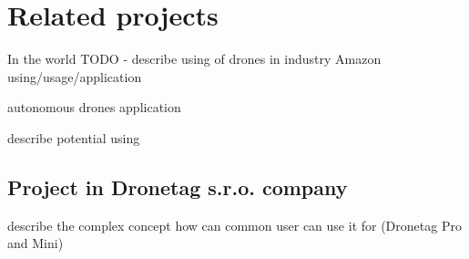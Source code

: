 \chapter{Related projects}\label{ch:related-projects}

In the world TODO - describe using of drones in industry
Amazon using/usage/application

autonomous drones application

describe potential using

\section{Project in Dronetag s.r.o. company}\label{sec:project-in-dronetag-s.r.o.-company}
describe the complex concept how can common user can use it for (Dronetag Pro and Mini)

